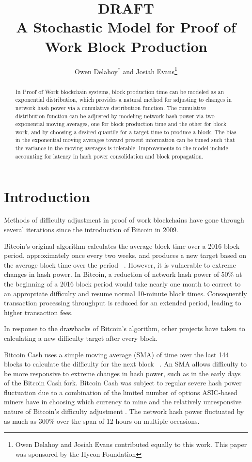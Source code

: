 \documentclass[]{article}
\title{\large DRAFT \\ A Stochastic Model for Proof of Work Block Production}
\author{Owen Delahoy$^*$ and Josiah Evans\footnote{Owen Delahoy and Josiah Evans contributed equally to this work. This paper was sponsored by the Hycon Foundation}}
\begin{document}
\maketitle


\begin{abstract}
In Proof of Work blockchain systems, block production time can be modeled as an exponential distribution, which provides a natural method for adjusting to changes in network hash power via a cumulative distribution function.  The cumulative distribution function can be adjusted by modeling network hash power via two exponential moving averages, one for block production time and the other for block work, and by choosing a desired quantile for a target time to produce a block.  The bias in the exponential moving averages toward present information can be tuned such that the variance in the moving averages is tolerable.  Improvements to the model include accounting for latency in hash power consolidation and block propagation.     
\end{abstract}

\section{Introduction}
Methods of difficulty adjustment in proof of work blockchains have gone through several iterations since the introduction of Bitcoin in 2009.  
\newline

Bitcoin's original algorithm calculates the average block time over a 2016 block period, approximately once every two weeks, and produces a new target based on the average block time over the period ~\cite{BitcoinRetarget}.  However, it is vulnerable to extreme changes in hash power.  In Bitcoin, a reduction of network hash power of 50\% at the beginning of a 2016 block period would take nearly one month to correct to an appropriate difficulty and resume normal 10-minute block times.  Consequently transaction processing throughput is reduced for an extended period, leading to higher transaction fees.   
\newline

In response to the drawbacks of Bitcoin's algorithm, other projects have taken to calculating a new difficulty target after every block.   
\newline

Bitcoin Cash uses a simple moving average (SMA) of time over the last 144 blocks to calculate the difficulty for the next block ~\cite{Bitcoin-ABC}.  An SMA allows difficulty to be more responsive to extreme changes in hash power, such as in the early days of the Bitcoin Cash fork.  Bitcoin Cash was subject to regular severe hash power fluctuation due to a combination of the limited number of options ASIC-based miners have in choosing which currency to mine and the relatively unresponsive nature of Bitcoin's difficulty adjustment \cite{BitcoinCashMining}.  The network hash power fluctuated by as much as 300\% \cite{BitcoinCashDifficulty} over the span of 12 hours on multiple occasions.   
\newline
\end{document}
